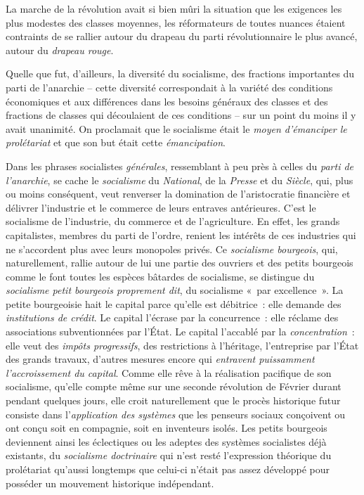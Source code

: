 \documentclass[french,twoside]{book} %
\begin{document}
La marche de la révolution avait si bien mûri la situation que les exigences les plus modestes des classes moyennes, les réformateurs de toutes nuances étaient contraints de se rallier autour du drapeau du parti révolutionnaire le plus avancé, autour du \emph{drapeau rouge}.\par
Quelle que fut, d’ailleurs, la diversité du socialisme, des fractions importantes du parti de l’anarchie – cette diversité correspondait à la variété des conditions économiques et aux différences dans les besoins généraux des classes et des fractions de classes qui découlaient de ces conditions – sur un point du moins il y avait unanimité. On proclamait que le socialisme était le \emph{moyen d’émanciper le prolétariat} et que son but était cette \emph{émancipation}.\par
Dans les phrases socialistes \emph{générales}, ressemblant à peu près à celles du \emph{parti de l’anarchie}, se cache le \emph{socialisme} du \emph{National}, de la \emph{Presse} et du \emph{Siècle}, qui, plus ou moins conséquent, veut renverser la domination de l’aristocratie financière et délivrer l’industrie et le commerce de leurs entraves antérieures. C’est le socialisme de l’industrie, du commerce et de l’agriculture. En effet, les grands capitalistes, membres du parti de l’ordre, renient les intérêts de ces industries qui ne s’accordent plus avec leurs monopoles privés. Ce \emph{socialisme bourgeois}, qui, naturellement, rallie autour de lui une partie des ouvriers et des petits bourgeois comme le font toutes les espèces bâtardes de socialisme, se distingue du \emph{socialisme petit bourgeois proprement dit}, du socialisme « par excellence ». La petite bourgeoisie hait le capital parce qu’elle est débitrice : elle demande des \emph{institutions de crédit}. Le capital l’écrase par la concurrence : elle réclame des associations subventionnées par l’État. Le capital l’accablé par la \emph{concentration} : elle veut des \emph{impôts progressifs}, des restrictions à l’héritage, l’entreprise par l’État des grands travaux, d’autres mesures encore qui \emph{entravent puissamment l’accroissement du capital}. Comme elle rêve à la réalisation pacifique de son socialisme, qu’elle compte même sur une seconde révolution de Février durant pendant quelques jours, elle croit naturellement que le procès historique futur consiste dans l’\emph{application des systèmes} que les penseurs sociaux conçoivent ou ont conçu soit en compagnie, soit en inventeurs isolés. Les petits bourgeois deviennent ainsi les éclectiques ou les adeptes des systèmes socialistes déjà existants, du \emph{socialisme doctrinaire} qui n’est resté l’expression théorique du prolétariat qu’aussi longtemps que celui-ci n’était pas assez développé pour posséder un mouvement historique indépendant.\par
\end{document}

